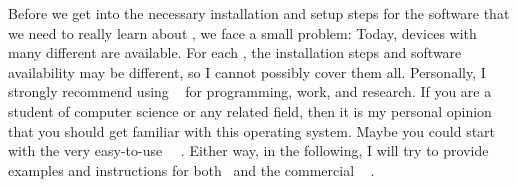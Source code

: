 Before we get into the necessary installation and setup steps for the software that we need to really learn about , we face a small problem:
Today, devices with many different  are available.
For each , the installation steps and software availability may be different, so I cannot possibly cover them all.
Personally, I strongly recommend using \linux~\cite{T1999TLE,B2022ELATCL,H2022LML} for programming, work, and research.
If you are a student of computer science or any related field, then it is my personal opinion that you should get familiar with this operating system.
Maybe you could start with the very easy-to-use \ubuntu\ \linux~\cite{CN2020ULB,H2020ULU2E}.
Either way, in the following, I will try to provide examples and instructions for both \ubuntu\ and the commercial \microsoftWindows~\cite{B2023W1IO} .%
%
%
%
%
%
%
\endhsection%
%
